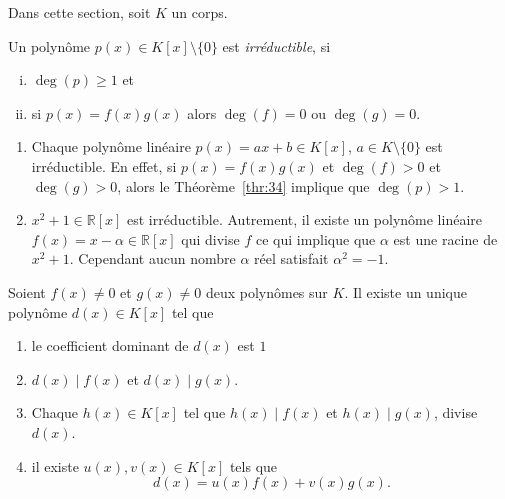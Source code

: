 Dans cette section, soit $K$ un corps.

\begin{definition}
  \label{def:53}
  Un polynôme $p(x) ∈ K[x] \setminus \{0\}$ est \emph{irréductible}, si
  \begin{enumerate}[i)]
  \item $\deg(p) ≥1$ et
  \item  si $p(x) = f(x) g(x)$ alors $\deg(f) = 0$ ou $\deg(g) = 0$. 
  \end{enumerate}
\end{definition}

\begin{example}
  \label{exe:46}
  \begin{enumerate}
  \item   Chaque polynôme linéaire $p(x) = ax + b ∈ K[x]$, $a ∈ K \setminus\{0\}$ est irréductible. En effet, si $p(x) = f(x) g(x)$ et $\deg(f)>0$ et $\deg(g)>0$, alors le Théorème~\ref{thr:34} implique que $\deg(p) >1$.
  \item $x^2 +1 ∈ℝ[x]$ est irréductible. Autrement, il existe un polynôme linéaire $f(x) =  x - α ∈ ℝ[x]$ qui divise $f$ ce qui implique que $α$ est une racine de $x^2 +1$. Cependant aucun nombre $α$ réel satisfait $α^2 = -1$.
  \end{enumerate}
\end{example}

\begin{theorem}
  Soient $f(x) ≠0$ et $g(x)≠0$ deux polynômes sur $K$. Il existe un unique polynôme $d(x)∈K[x]$ tel que
  \begin{enumerate}
  \item le coefficient dominant de $d(x)$ est $1$
  \item $d(x) \mid f(x)$ et $d(x) \mid g(x)$.
  \item Chaque $h(x) ∈ K[x]$ tel que $h(x) \mid f(x)$  et $h(x) \mid g(x)$, divise $d(x)$.
  \item il existe $u(x), v(x) ∈K[x]$ tels que
    \begin{displaymath}
      d(x) = u(x) f(x) + v(x) g(x). 
    \end{displaymath}
  \end{enumerate}
\end{theorem}


